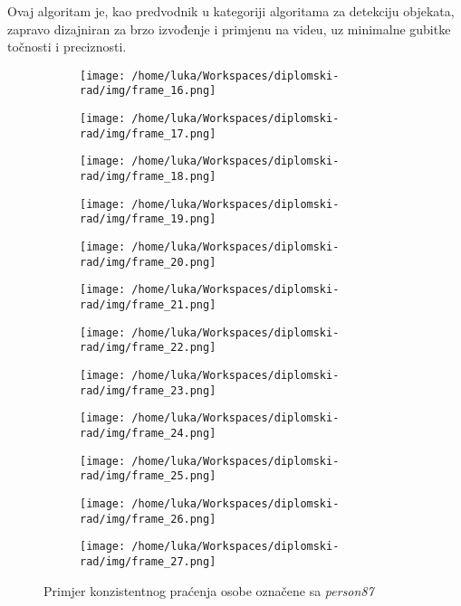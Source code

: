 Ovaj algoritam je, kao predvodnik u kategoriji algoritama za detekciju objekata, zapravo dizajniran za brzo izvođenje i primjenu na videu, uz minimalne gubitke točnosti i preciznosti. 

\begin{figure}[htp]
	\centering
	\begin{subfigure}[b]{0.4\linewidth}
		\texttt{[image: /home/luka/Workspaces/diplomski-rad/img/frame\_16.png]}
	\end{subfigure}
	\begin{subfigure}[b]{0.4\linewidth}
		\texttt{[image: /home/luka/Workspaces/diplomski-rad/img/frame\_17.png]}
	\end{subfigure}
	\begin{subfigure}[b]{0.4\linewidth}
		\texttt{[image: /home/luka/Workspaces/diplomski-rad/img/frame\_18.png]}
	\end{subfigure}
	\begin{subfigure}[b]{0.4\linewidth}
		\texttt{[image: /home/luka/Workspaces/diplomski-rad/img/frame\_19.png]}
	\end{subfigure}
	\begin{subfigure}[b]{0.4\linewidth}
		\texttt{[image: /home/luka/Workspaces/diplomski-rad/img/frame\_20.png]}
	\end{subfigure}
	\begin{subfigure}[b]{0.4\linewidth}
		\texttt{[image: /home/luka/Workspaces/diplomski-rad/img/frame\_21.png]}
	\end{subfigure}
	\begin{subfigure}[b]{0.4\linewidth}
		\texttt{[image: /home/luka/Workspaces/diplomski-rad/img/frame\_22.png]}
	\end{subfigure}
	\begin{subfigure}[b]{0.4\linewidth}
		\texttt{[image: /home/luka/Workspaces/diplomski-rad/img/frame\_23.png]}
	\end{subfigure}
	\begin{subfigure}[b]{0.4\linewidth}
		\texttt{[image: /home/luka/Workspaces/diplomski-rad/img/frame\_24.png]}
	\end{subfigure}
	\begin{subfigure}[b]{0.4\linewidth}
		\texttt{[image: /home/luka/Workspaces/diplomski-rad/img/frame\_25.png]}
	\end{subfigure}
	\begin{subfigure}[b]{0.4\linewidth}
		\texttt{[image: /home/luka/Workspaces/diplomski-rad/img/frame\_26.png]}
	\end{subfigure}
	\begin{subfigure}[b]{0.4\linewidth}
		\texttt{[image: /home/luka/Workspaces/diplomski-rad/img/frame\_27.png]}
	\end{subfigure}
	\caption{Primjer konzistentnog praćenja osobe označene sa \textit{person87}}
	\label{img:tracking}
\end{figure}

